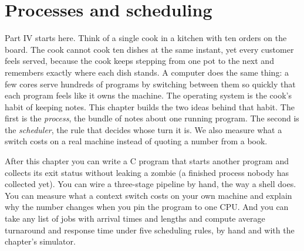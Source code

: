 \chapter{Processes and scheduling}
\label{ch:systems12}

Part IV starts here. Think of a single cook in a kitchen with ten
orders on the board. The cook cannot cook ten dishes at the same
instant, yet every customer feels served, because the cook keeps
stepping from one pot to the next and remembers exactly where each
dish stands. A computer does the same thing: a few cores serve
hundreds of programs by switching between them so quickly that each
program feels like it owns the machine. The operating system is the
cook's habit of keeping notes. This chapter builds the two ideas
behind that habit. The first is the \emph{process}, the bundle of
notes about one running program. The second is the \emph{scheduler},
the rule that decides whose turn it is. We also measure what a
switch costs on a real machine instead of quoting a number from a
book.

\begin{wins}
After this chapter you can write a C program that starts another
program and collects its exit status without leaking a zombie (a
finished process nobody has collected yet). You can wire a
three-stage pipeline by hand, the way a shell does. You can measure
what a context switch costs on your own machine and explain why the
number changes when you pin the program to one CPU. And you can take
any list of jobs with arrival times and lengths and compute average
turnaround and response time under five scheduling rules, by hand
and with the chapter's simulator.
\end{wins}

